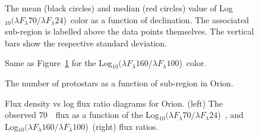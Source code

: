 \documentclass[manuscript]{aastex61}
\newcommand{\clra}{Log$_{10}(\lambda F_\lambda70/\lambda F_\lambda24$)}
\newcommand{\clrb}{Log$_{10}(\lambda F_\lambda160/\lambda F_\lambda100$)}
\begin{document}
\clearpage

%
%
%

\begin{figure}[ht]
\centering
{}
\caption{The mean (black circles) and median (red circles) value of \clra\ color as a function of declination.  The associated sub-region is labelled above the data points themselves.  The vertical bars show the respective standard deviation.  \label{fig:clr1_v_dec}}
\end{figure}

\clearpage

\begin{figure}[ht]
\centering
{}
\caption{Same as Figure~\ref{fig:clr1_v_dec} for the \clrb\ color.  \label{fig:clr2_v_dec}}
\end{figure}

\clearpage

\begin{figure}[ht]
\centering
{}
\caption{The number of protostars as a function of sub-region in Orion.\label{fig:num_v_dec}}
\end{figure}

\clearpage

\begin{figure}[ht]
\centering
{}
\caption{Flux density vs log flux ratio diagrams for Orion.  (left) The observed 70~\micron\ flux as a function of the \clra\ , and \clrb\ (right) flux ratios.\label{fig:clrflux}}
\end{figure}

\clearpage
\end{document}
